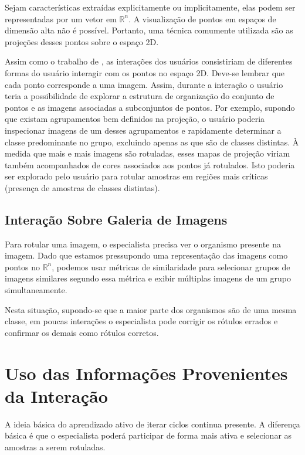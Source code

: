 Sejam características extraídas explicitamente ou implicitamente, elas podem ser representadas por um vetor em $\mathbb{R}^n$. A visualização de pontos em espaços de dimensão alta não é possível. Portanto, uma técnica comumente utilizada são as projeções desses pontos sobre o espaço 2D.  

Assim como o trabalho de \citep{bernard2018comparing}, as interações dos usuários consistiriam de diferentes formas do usuário interagir com os pontos no espaço 2D.  Deve-se lembrar que cada ponto corresponde a uma imagem. Assim, durante a interação o usuário teria a possibilidade de explorar a estrutura de organização do conjunto de pontos e as imagens associadas a subconjuntos de pontos. Por exemplo, supondo que existam agrupamentos bem definidos na projeção, o usuário poderia inspecionar imagens de um desses agrupamentos e rapidamente determinar a classe predominante no grupo, excluindo apenas as que são de classes distintas. À medida que mais e mais imagens são rotuladas, esses mapas de projeção viriam também acompanhados de cores associados aos pontos já rotulados. Isto poderia ser explorado pelo usuário para rotular amostras em regiões mais críticas (presença de amostras de classes distintas).




\subsection{Interação Sobre Galeria de Imagens} 
\label{sec:galeria_imagens}

Para rotular uma imagem, o especialista precisa ver o organismo presente na imagem. Dado que estamos pressupondo uma representação  das imagens como pontos no $\mathbb{R}^n$, podemos usar métricas de similaridade para selecionar grupos de imagens similares segundo essa métrica e exibir múltiplas imagens de um grupo simultaneamente.
 
Nesta situação, supondo-se que a maior parte dos organismos são de uma mesma classe, em poucas interações o especialista pode corrigir os rótulos errados e confirmar os demais como rótulos corretos. 


\section{Uso das Informações Provenientes da Interação}
\label{sec:uso_das_informacoes_interacao}

A ideia básica do aprendizado ativo de iterar ciclos continua presente. A diferença básica é que o especialista poderá participar de forma mais ativa e selecionar as amostras a serem rotuladas.

